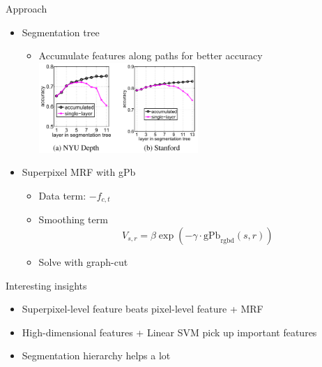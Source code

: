 \documentclass[12pt]{beamer}
\begin{document}
\begin{frame}{Approach}
	\begin{itemize}
		\item Segmentation tree
		\begin{itemize}
			\item Accumulate features along paths for better accuracy \\
			\medskip
			\includegraphics[width=0.5\textwidth]{fig4.png}
		\end{itemize}
		\item Superpixel MRF with gPb
		\begin{itemize}
			\item Data term: $-f_{c, t}$
			\item Smoothing term
			\[V_{s, r} = \beta \exp(-\gamma \cdot \text{gPb}_\text{rgbd}(s, r))\]
			\item Solve with graph-cut
		\end{itemize}
	\end{itemize}
\end{frame}

\begin{frame}{Interesting insights}
    \begin{itemize}
        \item Superpixel-level feature beats pixel-level feature + MRF
        \item High-dimensional features + Linear SVM pick up important features
        \item Segmentation hierarchy helps a lot
    \end{itemize}
\end{frame}
\end{document}
